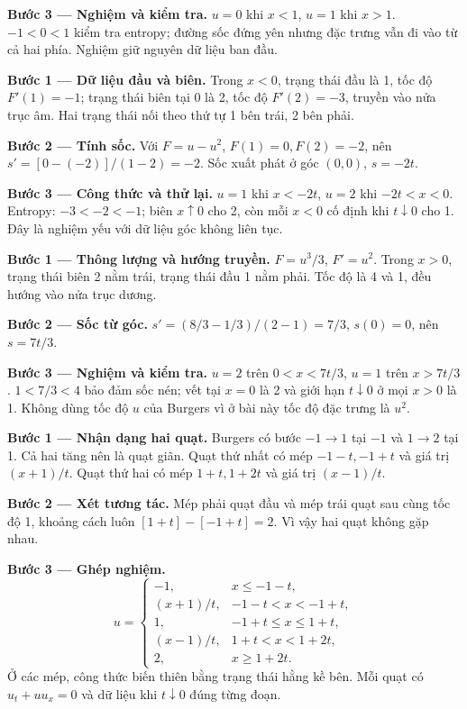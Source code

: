 \textbf{Bước 3 — Nghiệm và kiểm tra.} $u=0$ khi $x<1$, $u=1$ khi $x>1$. $-1<0<1$ kiểm tra entropy; đường sốc đứng yên nhưng đặc trưng vẫn đi vào từ cả hai phía. Nghiệm giữ nguyên dữ liệu ban đầu.

\textbf{Bước 1 — Dữ liệu đầu và biên.} Trong $x<0$, trạng thái đầu là 1, tốc độ $F'(1)=-1$; trạng thái biên tại 0 là 2, tốc độ $F'(2)=-3$, truyền vào nửa trục âm. Hai trạng thái nối theo thứ tự 1 bên trái, 2 bên phải.

\textbf{Bước 2 — Tính sốc.} Với $F=u-u^2$, $F(1)=0,F(2)=-2$, nên $s'=[0-(-2)]/(1-2)=-2$. Sốc xuất phát ở góc $(0,0)$, $s=-2t$.

\textbf{Bước 3 — Công thức và thử lại.} $u=1$ khi $x<-2t$, $u=2$ khi $-2t<x<0$. Entropy: $-3<-2<-1$; biên $x\uparrow0$ cho 2, còn mỗi $x<0$ cố định khi $t\downarrow0$ cho 1. Đây là nghiệm yếu với dữ liệu góc không liên tục.

\textbf{Bước 1 — Thông lượng và hướng truyền.} $F=u^3/3$, $F'=u^2$. Trong $x>0$, trạng thái biên 2 nằm trái, trạng thái đầu 1 nằm phải. Tốc độ là 4 và 1, đều hướng vào nửa trục dương.

\textbf{Bước 2 — Sốc từ góc.} $s'=(8/3-1/3)/(2-1)=7/3$, $s(0)=0$, nên $s=7t/3$.

\textbf{Bước 3 — Nghiệm và kiểm tra.} $u=2$ trên $0<x<7t/3$, $u=1$ trên $x>7t/3$. $1<7/3<4$ bảo đảm sốc nén; vết tại $x=0$ là 2 và giới hạn $t\downarrow0$ ở mọi $x>0$ là 1. Không dùng tốc độ $u$ của Burgers vì ở bài này tốc độ đặc trưng là $u^2$.

\textbf{Bước 1 — Nhận dạng hai quạt.} Burgers có bước $-1\to1$ tại $-1$ và $1\to2$ tại 1. Cả hai tăng nên là quạt giãn. Quạt thứ nhất có mép $-1-t,-1+t$ và giá trị $(x+1)/t$. Quạt thứ hai có mép $1+t,1+2t$ và giá trị $(x-1)/t$.

\textbf{Bước 2 — Xét tương tác.} Mép phải quạt đầu và mép trái quạt sau cùng tốc độ 1, khoảng cách luôn $[1+t]-[-1+t]=2$. Vì vậy hai quạt không gặp nhau.

\textbf{Bước 3 — Ghép nghiệm.}
\[u=\begin{cases}-1,&x\le-1-t,\\(x+1)/t,&-1-t<x<-1+t,\\1,&-1+t\le x\le1+t,\\(x-1)/t,&1+t<x<1+2t,\\2,&x\ge1+2t.\end{cases}\]
Ở các mép, công thức biến thiên bằng trạng thái hằng kề bên. Mỗi quạt có $u_t+uu_x=0$ và dữ liệu khi $t\downarrow0$ đúng từng đoạn.

